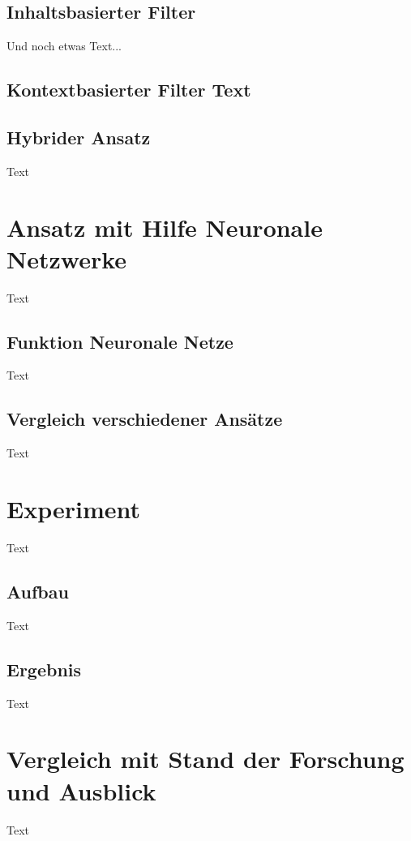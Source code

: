 \documentclass[twosided,a4,10pt]{article}
\begin{document}
\begin{multicols}{2}
\subsection{Inhaltsbasierter Filter}
Und noch etwas Text... \cite{muster}

\subsection{Kontextbasierter Filter
	Text}

\subsection{Hybrider Ansatz}
Text

\section{Ansatz mit Hilfe Neuronale Netzwerke}
Text

\subsection{Funktion Neuronale Netze}
Text

\subsection{Vergleich verschiedener Ansätze}
Text

\section{Experiment}
Text

\subsection{Aufbau}
Text

\subsection{Ergebnis}
Text

\section{Vergleich mit Stand der Forschung und Ausblick}
Text




\end{multicols}
\end{document}
